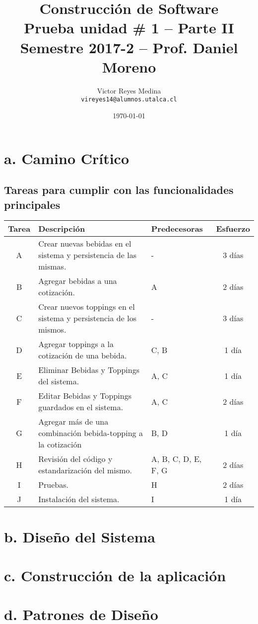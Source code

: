 \documentclass[11pt]{utalcaDoc}
\title{{\bf \Large Construcción de Software \\ 
			Prueba unidad \# 1 -- Parte II}\\ 
			{\normalsize Semestre 2017-2 -- Prof. Daniel Moreno}}
\author{
  Victor Reyes Medina\\
  \texttt{vireyes14@alumnos.utalca.cl}
}
\date{\today}
\begin{document}
\renewcommand{\figurename}{Figura~}
\renewcommand{\tablename}{Tabla~}
\renewcommand{\lstlistingname}{Código~}
\renewcommand{\theenumii}{\arabic{enumii}}
\renewcommand{\labelenumii}{%
  \theenumii.
}
\maketitle


\section*{a. Camino Crítico}
\subsection*{Tareas para cumplir con las funcionalidades principales}

\begin{tabular}{|c|p{9.5cm}|p{3cm} |c|}
\hline 
\textbf{Tarea} & \textbf{Descripción} & \textbf{Predecesoras} & \textbf{Esfuerzo}\\ 
\hline 
A & Crear nuevas bebidas en el sistema y persistencia de las mismas. & - & 3 días  \\ 
\hline 
B & Agregar bebidas a una cotización. & A & 2 días \\ 
\hline 
C & Crear nuevos toppings en el sistema y persistencia de los mismos. & - & 3 días  \\ 
\hline 
D & Agregar toppings a la cotización de una bebida. & C, B & 1 día  \\ 
\hline 
E & Eliminar Bebidas y Toppings del sistema. & A, C & 1 día  \\ 
\hline 
F & Editar Bebidas y Toppings guardados en el sistema. & A, C & 2 días  \\ 
\hline 
G & Agregar más de una combinación bebida-topping a la cotización & B, D & 1 día  \\ 
\hline 
H & Revisión del código y estandarización del mismo. & A, B, C, D, E, F, G & 2 días  \\ 
\hline 
I & Pruebas. & H & 2 días  \\ 
\hline
J & Instalación del sistema. & I & 1 día  \\ 
\hline



\end{tabular} 

\section*{b. Diseño del Sistema}

\section*{c. Construcción de la aplicación}

\section*{d. Patrones de Diseño}
\end{document}
